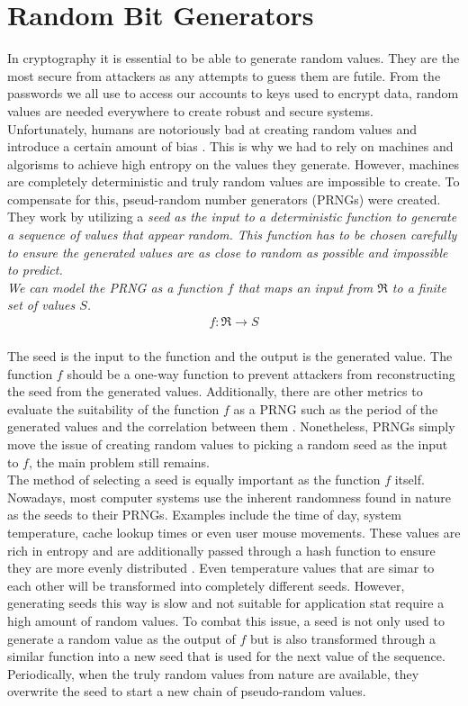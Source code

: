 \section{Random Bit Generators}

In cryptography it is essential to be able to generate random values. They are the most secure from attackers as any attempts to guess them are futile. From the passwords we all use to access our accounts to keys used to encrypt data, random values are needed everywhere to create robust and secure systems.
\\

Unfortunately, humans are notoriously bad at creating random values and introduce a certain amount of bias \cite{human-randomness}. This is why we had to rely on machines and algorisms to achieve high entropy on the values they generate. However, machines are completely deterministic and truly random values are impossible to create. To compensate for this, pseud-random number generators (PRNGs) were created. They work by utilizing a \it{seed} as the input to a deterministic function to generate a sequence of values that appear random. This function has to be chosen carefully to ensure the generated values are as close to random as possible and impossible to predict.
\\

We can model the PRNG as a function $f$ that maps an input from $\Re$ to a finite set of values $S$. \cite{prng}
\begin{align}
    f: \Re \rightarrow S\\
\end{align}

The seed is the input to the function and the output is the generated value. The function $f$ should be a one-way function \cite{one-way-function} to prevent attackers from reconstructing the seed from the generated values. Additionally, there are other metrics to evaluate the suitability of the function $f$ as a PRNG such as the period of the generated values and the correlation between them \cite{prng}. Nonetheless, PRNGs simply move the issue of creating random values to picking a random seed as the input to $f$, the main problem still remains.
\\

The method of selecting a seed is equally important as the function $f$ itself. Nowadays, most computer systems use the inherent randomness found in nature as the seeds to their PRNGs. Examples include the time of day, system temperature, cache lookup times or even user mouse movements. These values are rich in entropy and are additionally passed through a hash function to ensure they are more evenly distributed \cite{prng}. Even temperature values that are simar to each other will be transformed into completely different seeds. However, generating seeds this way is slow and not suitable for application stat require a high amount of random values. To combat this issue, a seed is not only used to generate a random value as the output of $f$ but is also transformed through a similar function into a new seed that is used for the next value of the sequence. Periodically, when the truly random values from nature are available, they overwrite the seed to start a new chain of pseudo-random values.

